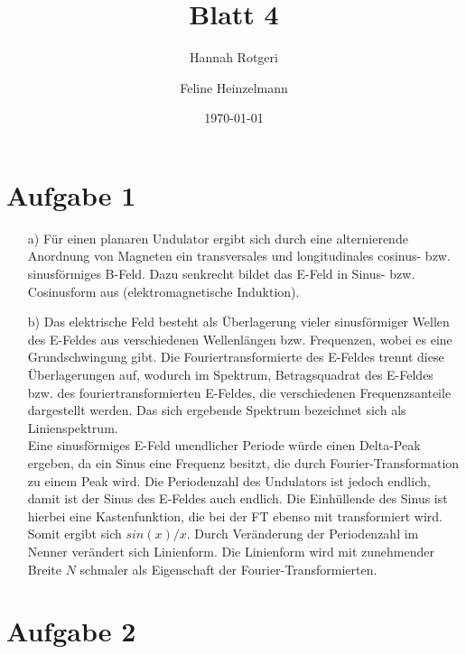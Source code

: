 \documentclass[11pt,a4paper]{article}
\title{Blatt 4}
\date{\today}
\author{Hannah Rotgeri \and Feline Heinzelmann}
\begin{document}
    \maketitle

    \section*{Aufgabe 1}
	\begin{itemize}
		\item[a)]
			Für einen planaren Undulator ergibt sich durch eine alternierende Anordnung von Magneten ein transversales und longitudinales cosinus- bzw. sinusförmiges B-Feld. 
			Dazu senkrecht bildet das E-Feld in Sinus- bzw. Cosinusform aus (elektromagnetische Induktion).
		\item[b)]
			Das elektrische Feld besteht als Überlagerung vieler sinusförmiger Wellen des E-Feldes aus verschiedenen Wellenlängen bzw. Frequenzen, wobei es eine Grundschwingung gibt.
			Die Fouriertransformierte des E-Feldes trennt diese Überlagerungen auf, wodurch im Spektrum, Betragsquadrat des E-Feldes bzw. des fouriertransformierten E-Feldes, 
			die verschiedenen Frequenzsanteile dargestellt werden. Das sich ergebende Spektrum bezeichnet sich als Linienspektrum. \\
			Eine sinusförmiges E-Feld unendlicher Periode würde einen Delta-Peak ergeben, da ein Sinus eine Frequenz besitzt, die durch Fourier-Transformation zu einem Peak wird.
			Die Periodenzahl des Undulators ist jedoch endlich, damit ist der Sinus des E-Feldes auch endlich. Die Einhüllende des Sinus ist hierbei eine Kastenfunktion, die bei der FT ebenso mit transformiert wird. 
			Somit ergibt sich $sin(x)/x$. Durch Veränderung der Periodenzahl im Nenner verändert sich Linienform. 
			Die Linienform wird mit zunehmender Breite $N$ schmaler als Eigenschaft der Fourier-Transformierten.
	\end{itemize}


	
    \section*{Aufgabe 2}
\end{document}
